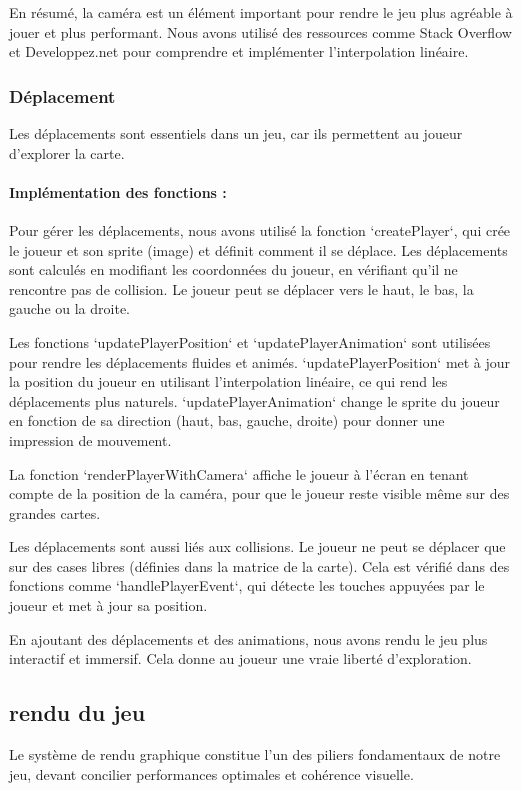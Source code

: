 \documentclass[12pt,a4paper, twoside]{article}
\begin{document}
    En résumé, la caméra est un élément important pour rendre le jeu plus agréable à jouer et plus performant. Nous avons utilisé des ressources comme Stack Overflow et Developpez.net pour comprendre et implémenter l'interpolation linéaire.
    \subsubsection{Déplacement}

    Les déplacements sont essentiels dans un jeu, car ils permettent au joueur d'explorer la carte.

    \paragraph{Implémentation des fonctions : }

    Pour gérer les déplacements, nous avons utilisé la fonction `createPlayer`, qui crée le joueur et son sprite (image) et définit comment il se déplace. Les déplacements sont calculés en modifiant les coordonnées du joueur, en vérifiant qu'il ne rencontre pas de collision. Le joueur peut se déplacer vers le haut, le bas, la gauche ou la droite.

    Les fonctions `updatePlayerPosition` et `updatePlayerAnimation` sont utilisées pour rendre les déplacements fluides et animés. `updatePlayerPosition` met à jour la position du joueur en utilisant l'interpolation linéaire, ce qui rend les déplacements plus naturels. `updatePlayerAnimation` change le sprite du joueur en fonction de sa direction (haut, bas, gauche, droite) pour donner une impression de mouvement.

    La fonction `renderPlayerWithCamera` affiche le joueur à l'écran en tenant compte de la position de la caméra, pour que le joueur reste visible même sur des grandes cartes.

    Les déplacements sont aussi liés aux collisions. Le joueur ne peut se déplacer que sur des cases libres (définies dans la matrice de la carte). Cela est vérifié dans des fonctions comme `handlePlayerEvent`, qui détecte les touches appuyées par le joueur et met à jour sa position.

    En ajoutant des déplacements et des animations, nous avons rendu le jeu plus interactif et immersif. Cela donne au joueur une vraie liberté d'exploration.

\newpage
\subsection{rendu du jeu}
Le système de rendu graphique constitue l'un des piliers fondamentaux de notre jeu, devant concilier performances optimales et cohérence visuelle.
\end{document}
